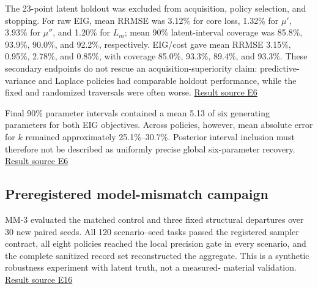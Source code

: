 The 23-point latent holdout was excluded from acquisition, policy
selection, and stopping. For raw EIG, mean RRMSE was 3.12\% for core
loss, 1.32\% for \(\mu'\), 3.93\% for \(\mu''\), and 1.20\% for \(L_m\);
mean 90\% latent-interval coverage was 85.8\%, 93.9\%, 90.0\%, and
92.2\%, respectively. EIG/cost gave mean RRMSE 3.15\%, 0.95\%, 2.78\%,
and 0.85\%, with coverage 85.0\%, 93.3\%, 89.4\%, and 93.3\%. These
secondary endpoints do not rescue an acquisition-superiority claim:
predictive-variance and Laplace policies had comparable holdout
performance, while the fixed and randomized traversals were often worse.
\href{https://github.com/hoangduong6210/EIG-bayesian-for-Recover-potential-Physical-Parameter-of-MagComponent/blob/927bbcb6d0b862598fae87d2575a872bbd79b5f1/wiki/evidence/Evidence-Sources.md\#e6}{Result
source E6}

Final 90\% parameter intervals contained a mean 5.13 of six generating
parameters for both EIG objectives. Across policies, however, mean
absolute error for \(k\) remained approximately 25.1\%--30.7\%.
Posterior interval inclusion must therefore not be described as
uniformly precise global six-parameter recovery.
\href{https://github.com/hoangduong6210/EIG-bayesian-for-Recover-potential-Physical-Parameter-of-MagComponent/blob/927bbcb6d0b862598fae87d2575a872bbd79b5f1/wiki/evidence/Evidence-Sources.md\#e6}{Result
source E6}

\hypertarget{preregistered-model-mismatch-campaign}{%
\subsection{Preregistered model-mismatch
campaign}\label{preregistered-model-mismatch-campaign}}

MM-3 evaluated the matched control and three fixed structural departures
over 30 new paired seeds. All 120 scenario--seed tasks passed the
registered sampler contract, all eight policies reached the local
precision gate in every scenario, and the complete sanitized record set
reconstructed the aggregate. This is a synthetic robustness experiment
with latent truth, not a measured- material validation.
\href{https://github.com/hoangduong6210/EIG-bayesian-for-Recover-potential-Physical-Parameter-of-MagComponent/blob/927bbcb6d0b862598fae87d2575a872bbd79b5f1/wiki/evidence/Evidence-Sources.md\#e16}{Result
source E16}

